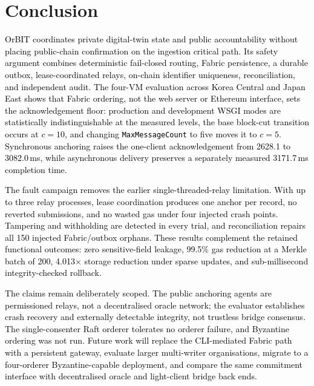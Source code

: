 \documentclass[final,5p,times,twocolumn]{elsarticle}
\begin{document}
\fi
\section{\textbf{Conclusion}}
\label{sec:conclusion}

\textcolor{black}{OrBIT coordinates private digital-twin state and public accountability without placing public-chain confirmation on the ingestion critical path. Its safety argument combines deterministic fail-closed routing, Fabric persistence, a durable outbox, lease-coordinated relays, on-chain identifier uniqueness, reconciliation, and independent audit. The four-VM evaluation across Korea Central and Japan East shows that Fabric ordering, not the web server or Ethereum interface, sets the acknowledgement floor: production and development WSGI modes are statistically indistinguishable at the measured levels, the base block-cut transition occurs at $c=10$, and changing \texttt{MaxMessageCount} to five moves it to $c=5$. Synchronous anchoring raises the one-client acknowledgement from 2628.1 to 3082.0\,ms, while asynchronous delivery preserves a separately measured 3171.7\,ms completion time.}

\textcolor{black}{The fault campaign removes the earlier single-threaded-relay limitation. With up to three relay processes, lease coordination produces one anchor per record, no reverted submissions, and no wasted gas under four injected crash points. Tampering and withholding are detected in every trial, and reconciliation repairs all 150 injected Fabric/outbox orphans. These results complement the retained functional outcomes: zero sensitive-field leakage, 99.5\% gas reduction at a Merkle batch of 200, 4.013$\times$ storage reduction under sparse updates, and sub-millisecond integrity-checked rollback.}

\textcolor{black}{The claims remain deliberately scoped. The public anchoring agents are permissioned relays, not a decentralised oracle network; the evaluator establishes crash recovery and externally detectable integrity, not trustless bridge consensus. The single-consenter Raft orderer tolerates no orderer failure, and Byzantine ordering was not run. Future work will replace the CLI-mediated Fabric path with a persistent gateway, evaluate larger multi-writer organisations, migrate to a four-orderer Byzantine-capable deployment, and compare the same commitment interface with decentralised oracle and light-client bridge back ends.}

\iffalse
\end{document}
